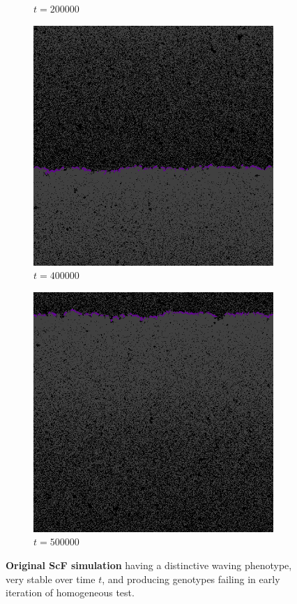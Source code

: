 \begin{figure}
\begin{subfigure}{.12\textwidth}
  \caption{$t=200000$}
\end{subfigure}%
\begin{subfigure}{.12\textwidth}
  \centering
  \includegraphics[width=1\linewidth]{img/sm400000}
  \caption{$t=400000$}
\end{subfigure}%
\begin{subfigure}{.12\textwidth}
  \centering
  \includegraphics[width=1\linewidth]{img/sm500000}
  \caption{$t=500000$}
\end{subfigure}
\caption{\textbf{Original ScF simulation} having a distinctive waving phenotype, very stable over time $t$, and producing genotypes failing in early iteration of homogeneous test.}
\label{fig:smalldistinctive}
\end{figure}
